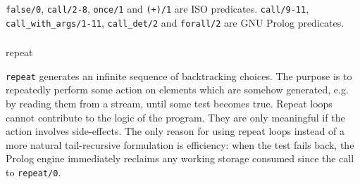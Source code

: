 \begin{PlErrors}


 







 

\end{PlErrors}

\Portability

\texttt{false/0}, \texttt{call/2-8}, \texttt{once/1} and \texttt{({\bs}+)/1}
are ISO predicates. \texttt{call/9-11}, \texttt{call\_with\_args/1-11},
\texttt{call\_det/2} and \texttt{forall/2} are GNU Prolog predicates.

\subsubsection{}

\begin{TemplatesOneCol}
repeat

\end{TemplatesOneCol}

\Description

\texttt{repeat} generates an infinite sequence of backtracking choices. The
purpose is to repeatedly perform some action on elements which are somehow
generated, e.g. by reading them from a stream, until some test becomes true.
Repeat loops cannot contribute to the logic of the program. They are only
meaningful if the action involves side-effects. The only reason for using
repeat loops instead of a more natural tail-recursive formulation is
efficiency: when the test fails back, the Prolog engine immediately reclaims
any working storage consumed since the call to \texttt{repeat/0}.

